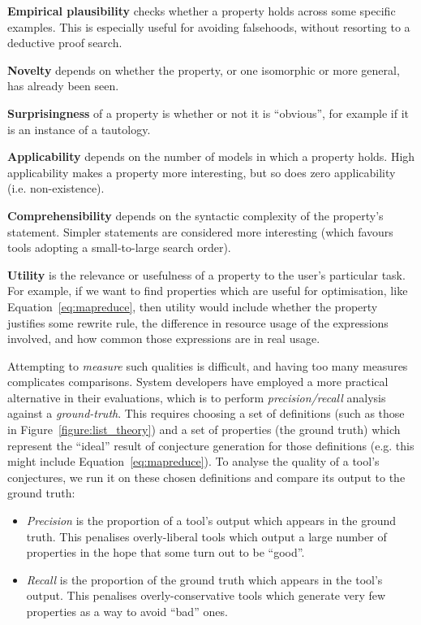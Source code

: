 {\bf Empirical plausibility} checks whether a property holds across some
specific examples. This is especially useful for avoiding falsehoods, without
resorting to a deductive proof search.

{\bf Novelty} depends on whether the property, or one isomorphic or more
general, has already been seen.

{\bf Surprisingness} of a property is whether or not it is ``obvious'', for
example if it is an instance of a tautology.

{\bf Applicability} depends on the number of models in which a
property holds. High applicability makes a property more interesting, but so
does zero applicability (i.e. non-existence).

{\bf Comprehensibility} depends on the syntactic complexity of the property's
statement. Simpler statements are considered more interesting (which favours
tools adopting a small-to-large search order).

{\bf Utility} is the relevance or usefulness of a property to the user's
particular task. For example, if we want to find properties which are useful for
optimisation, like Equation~\ref{eq:mapreduce}, then utility would include
whether the property justifies some rewrite rule, the difference in resource
usage of the expressions involved, and how common those expressions are in real
usage.

Attempting to \emph{measure} such qualities is difficult, and having too many
measures complicates comparisons. System developers have employed a more
practical alternative in their evaluations, which is to perform
\emph{precision/recall} analysis against a \emph{ground-truth}. This requires
choosing a set of definitions (such as those in Figure~\ref{figure:list_theory})
and a set of properties (the ground truth) which represent the ``ideal'' result
of conjecture generation for those definitions (e.g. this might include
Equation~\ref{eq:mapreduce}). To analyse the quality of a tool's conjectures, we
run it on these chosen definitions and compare its output to the ground truth:

\begin{itemize}
\item \emph{Precision} is the proportion of a tool's output which appears in
  the ground truth. This penalises overly-liberal tools which output a large
  number of properties in the hope that some turn out to be ``good''.
\item \emph{Recall} is the proportion of the ground truth which appears in the
  tool's output. This penalises overly-conservative tools which generate very
  few properties as a way to avoid ``bad'' ones.
\end{itemize}

